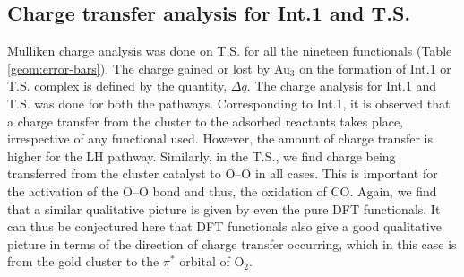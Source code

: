 \subsection{Charge transfer analysis for Int.1 and T.S.}
Mulliken charge analysis was done on T.S. for all the nineteen functionals (Table \ref{geom:error-bars}). The charge gained or lost by Au$_3$ on the formation of Int.1 or T.S. complex is defined by the quantity, $\Delta q$. The charge analysis for Int.1 and T.S. was done for both the pathways. Corresponding to Int.1, it is observed that a charge transfer from the cluster to the adsorbed reactants takes place, irrespective of any functional used. However, the amount of charge transfer is higher for the LH pathway. Similarly, in the T.S., we find charge being transferred from the cluster catalyst to O--O in all cases. This is important for the activation of the O--O bond and thus, the oxidation of CO. Again, we find that a similar qualitative picture is given by even the pure DFT functionals. It can thus be conjectured here that DFT functionals also give a good qualitative picture in terms of the direction of charge transfer occurring, which in this case is from the gold cluster to the $\pi^*$ orbital of O$_2$.

